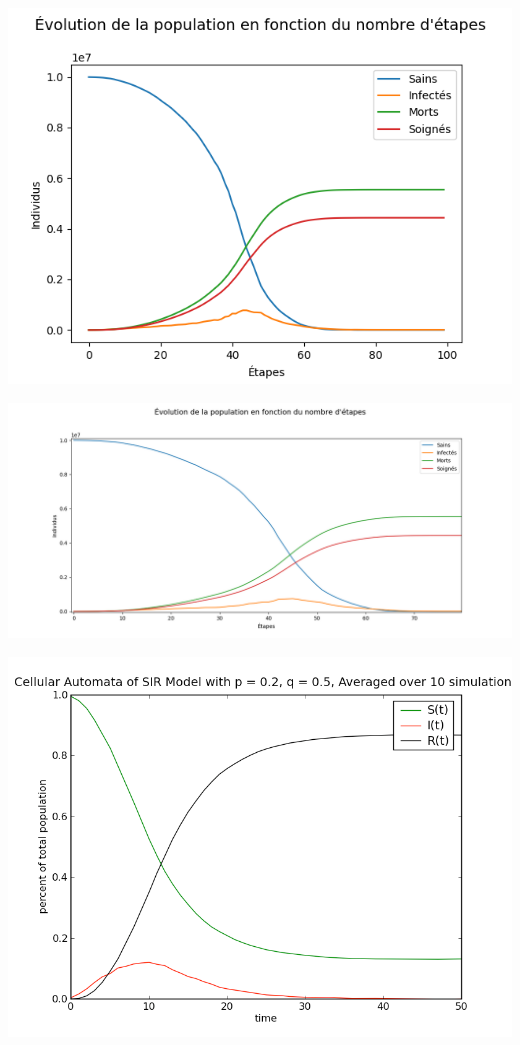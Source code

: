 \documentclass{article}
\begin{document}
\includegraphics[scale=1]{../images/tttt.png}

\includegraphics[scale=0.5]{../images/tttttttttt.png}   

\includegraphics[scale=0.5]{../images/automate_cellulaire_comp.png} 
\end{document}
